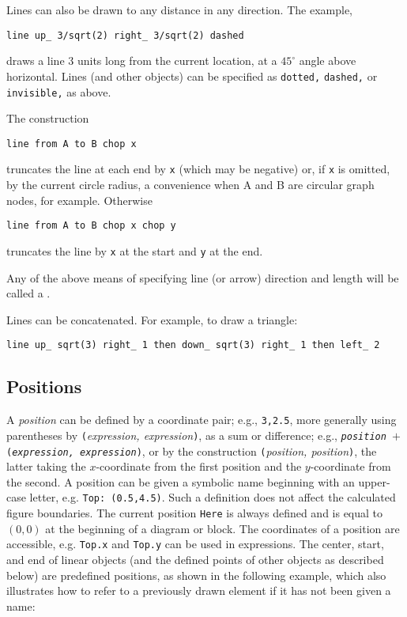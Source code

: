Lines can also be drawn to any distance in any direction.  The example,

{\tt line up\_ 3/sqrt(2) right\_ 3/sqrt(2) dashed}

\noindent
draws a line 3 units long from the current location,
at a $45^\circ$ angle above horizontal.
Lines (and other objects) can be specified as {\tt dotted,} {\tt dashed,} or
{\tt invisible,} as above.

The construction

{\tt line from A to B chop x}

\noindent
truncates the line at each end by {\tt x} (which may be negative)
or, if {\tt x} is omitted, by
the current circle radius, a convenience when A and B are
circular graph nodes, for example.  Otherwise

{\tt line from A to B chop x chop y}

\noindent
truncates the line by {\tt x} at the start and {\tt y} at the end.

Any of the above means of specifying line (or arrow) direction and length
will be called a \linespec.

Lines can be concatenated.  For example, to draw a triangle:

{\tt line up\_ sqrt(3) right\_ 1 then down\_ sqrt(3) right\_ 1 then left\_ 2}

\subsection{Positions\label{Positions:}}
A {\sl position} can be defined by a coordinate pair;
 e.g., {\tt 3,2.5},
more generally using parentheses by {\tt (}{\sl expression, expression}{\tt )},
as a sum or difference;
 e.g., {\tt{\sl position} $+$ ({\sl expression, expression})},
or by the construction {\tt (}{\sl position, position}{\tt )},
the latter taking the $x$-coordinate from the first
position and the $y$-coordinate from the second.  A position can be
given a symbolic name beginning with an upper-case letter,
e.g. {\tt Top:~(0.5,4.5)}.  Such a definition does not affect the calculated
figure boundaries.  The current position {\tt Here} is always defined and
is equal to $(0,0)$ at the beginning of a diagram or block.
The coordinates of a position are accessible, e.g. {\tt Top.x} and
{\tt Top.y} can be used in expressions.  The center, start, and end of
linear objects (and the defined points of other objects as described below)
are predefined positions, as shown in the following example,
which also illustrates how to refer to a previously drawn element if it has
not been given a name:

